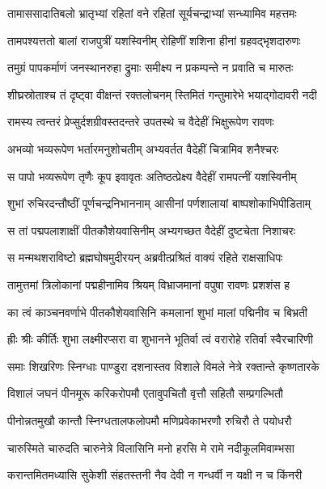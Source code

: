 \twolineshloka
{तामाससादातिबलो भ्रातृभ्यां रहितां वने}
{रहितां सूर्यचन्द्राभ्यां सन्ध्यामिव महत्तमः} %

\twolineshloka
{तामपश्यत्ततो बालां राजपुत्रीं यशस्विनीम्}
{रोहिणीं शशिना हीनां ग्रहवद्भृशदारुणः} %

\twolineshloka
{तमुग्रं पापकर्माणं जनस्थानरुहा द्रुमाः}
{समीक्ष्य न प्रकम्पन्ते न प्रवाति च मारुतः} %

\twolineshloka
{शीघ्रस्रोताश्च तं दृष्ट्वा वीक्षन्तं रक्तलोचनम्}
{स्तिमितं गन्तुमारेभे भयाद्गोदावरी नदी} %

\twolineshloka
{रामस्य त्वन्तरं प्रेप्सुर्दशग्रीवस्तदन्तरे}
{उपतस्थे च वैदेहीं भिक्षुरूपेण रावणः} %

\twolineshloka
{अभव्यो भव्यरूपेण भर्तारमनुशोचतीम्}
{अभ्यवर्तत वैदेहीं चित्रामिव शनैश्चरः} %

\twolineshloka
{स पापो भव्यरूपेण तृणैः कूप इवावृतः}
{अतिष्ठत्प्रेक्ष्य वैदेहीं रामपत्नीं यशस्विनीम्} %

\twolineshloka
{शुभां रुचिरदन्तौष्ठीं पूर्णचन्द्रनिभाननाम्}
{आसीनां पर्णशालायां बाष्पशोकाभिपीडिताम्} %

\twolineshloka
{स तां पद्मपलाशाक्षीं पीतकौशेयवासिनीम्}
{अभ्यगच्छत वैदेहीं दुष्टचेता निशाचरः} %

\twolineshloka
{स मन्मथशराविष्टो ब्रह्मघोषमुदीरयन्}
{अब्रवीत्प्रश्रितं वाक्यं रहिते राक्षसाधिपः} %

\twolineshloka
{तामुत्तमां त्रिलोकानां पद्महीनामिव श्रियम्}
{विभ्राजमानां वपुषा रावणः प्रशशंस ह} %

\twolineshloka
{का त्वं काञ्चनवर्णाभे पीतकौशेयवासिनि}
{कमलानां शुभां मालां पद्मिनीव च बिभ्रती} %

\twolineshloka
{ह्रीः श्रीः कीर्तिः शुभा लक्ष्मीरप्सरा वा शुभानने}
{भूतिर्वा त्वं वरारोहे रतिर्वा स्वैरचारिणी} %

\twolineshloka
{समाः शिखरिणः स्निग्धाः पाण्डुरा दशनास्तव}
{विशाले विमले नेत्रे रक्तान्ते कृष्णतारके} %

\twolineshloka
{विशालं जघनं पीनमूरू करिकरोपमौ}
{एतावुपचितौ वृत्तौ सहितौ सम्प्रगल्भितौ} %

\twolineshloka
{पीनोन्नतमुखौ कान्तौ स्निग्धतालफलोपमौ}
{मणिप्रवेकाभरणौ रुचिरौ ते पयोधरौ} %

\twolineshloka
{चारुस्मिते चारुदति चारुनेत्रे विलासिनि}
{मनो हरसि मे रामे नदीकूलमिवाम्भसा} %

\twolineshloka
{करान्तमितमध्यासि सुकेशी संहतस्तनी}
{नैव देवी न गन्धर्वी न यक्षी न च किंनरी} %

